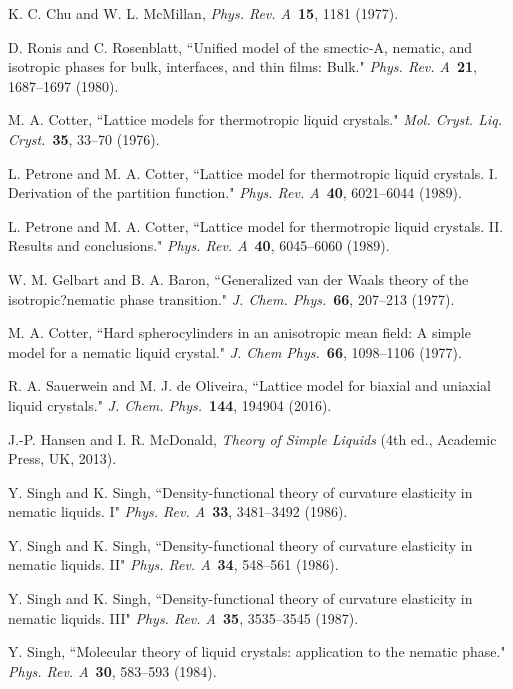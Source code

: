 \documentclass[jcp,aps,twocolumn,showpacs,supergroupedaddress,epsfig,amsmath,amssymb,eqsecnum]{revtex4}
\begin{document}
\begin{thebibliography}{99}
K. C. Chu and W. L. McMillan, {\em Phys. Rev. A}~{\bf 15}, 1181 (1977). 

D. Ronis and C. Rosenblatt, ``Unified model of the smectic-A, nematic, and isotropic phases for bulk, interfaces, and thin films: Bulk."
{\em Phys. Rev. A}~{\bf 21}, 1687--1697 (1980).

M. A. Cotter, ``Lattice models for thermotropic liquid crystals." 
{\em Mol. Cryst. Liq. Cryst.}~{\bf 35}, 33--70 (1976).

L. Petrone and M. A. Cotter, ``Lattice model for thermotropic liquid crystals. I. Derivation of the partition function." 
{\em Phys. Rev. A}~{\bf 40}, 6021--6044 (1989).

L. Petrone and M. A. Cotter, ``Lattice model for thermotropic liquid crystals. II. Results and conclusions." 
{\em Phys. Rev. A}~{\bf 40}, 6045--6060 (1989).

W. M. Gelbart and B. A. Baron, ``Generalized van der Waals theory of the isotropic?nematic phase transition." 
{\em J. Chem. Phys.}~{\bf 66}, 207--213 (1977).

M. A. Cotter, ``Hard spherocylinders in an anisotropic mean field: A simple model for a nematic liquid crystal." 
{\em J. Chem Phys.}~{\bf 66}, 1098--1106 (1977).   

R. A. Sauerwein and M. J. de Oliveira, 
``Lattice model for biaxial and uniaxial liquid crystals." 
{\em J. Chem. Phys.}~{\bf 144}, 194904 (2016). 

J.-P. Hansen and I. R. McDonald, {\em Theory of Simple Liquids} (4th ed., Academic Press, UK, 2013). 

Y. Singh and K. Singh, 
``Density-functional theory of curvature elasticity in nematic liquids. I"
{\em Phys. Rev. A}~{\bf 33}, 3481--3492 (1986). 

Y. Singh and K. Singh, 
``Density-functional theory of curvature elasticity in nematic liquids. II"
{\em Phys. Rev. A}~{\bf 34}, 548--561 (1986). 

Y. Singh and K. Singh, 
``Density-functional theory of curvature elasticity in nematic liquids. III"
{\em Phys. Rev. A}~{\bf 35}, 3535--3545 (1987). 

Y. Singh, ``Molecular theory of liquid crystals: application to the nematic phase." 
{\em Phys. Rev. A}~{\bf 30}, 583--593 (1984).     


\end{thebibliography}
\end{document}
